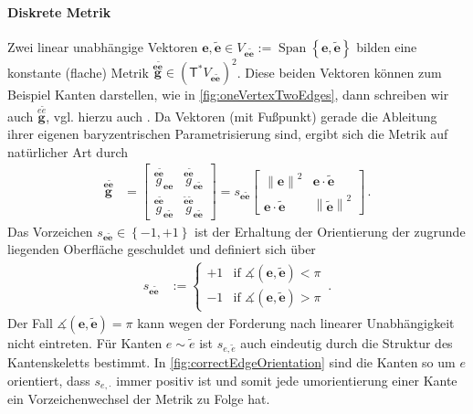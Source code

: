 \documentclass[a4paper,11pt]{scrartcl}
\newcommand{\g}{\mathbf{g}} %
\newcommand{\vect}[1]{\mathbf{#1}}
\newcommand{\Tangent}{\mathsf{T}}
\newcommand{\flatgb}[2]{\overset{#1 #2}{\g}}
\newcommand{\flatg}[2]{\overset{#1 #2}{g}}
\newcommand{\formPeriod}{\,\text{.}}
\begin{document}
    \paragraph{Diskrete Metrik}
      Zwei linear unabhängige  Vektoren \( \vect{e},\tilde{\vect{e}}\in V_{\vect{e}\tilde{\vect{e}}} := \operatorname{Span}\left\{  \vect{e},\tilde{\vect{e}} \right\} \)       
      bilden eine konstante (flache) Metrik \( \flatgb{\vect{e}}{\tilde{\vect{e}}}\in(\Tangent^{*}V_{\vect{e}\tilde{\vect{e}}})^{2} \).
      Diese beiden Vektoren können zum Beispiel Kanten darstellen, wie in \autoref{fig:oneVertexTwoEdges},
      dann schreiben wir auch \( \flatgb{e}{\tilde{e}} \), vgl. hierzu auch \cite{Nestler2016}.
      Da Vektoren (mit Fußpunkt) gerade die Ableitung ihrer eigenen baryzentrischen Parametrisierung sind, 
      ergibt sich die Metrik auf natürlicher Art durch
      \begin{align}
        \flatgb{\vect{e}}{\tilde{\vect{e}}}
            &=
                \begin{bmatrix}
                  \flatg{\vect{e}}{\tilde{\vect{e}}}_{\vect{e}\vect{e}} & \flatg{\vect{e}}{\tilde{\vect{e}}}_{\vect{e}\tilde{\vect{e}}} \\
                  \flatg{\vect{e}}{\tilde{\vect{e}}}_{\vect{e}\tilde{\vect{e}}} & \flatg{\tilde{\vect{e}}}{\tilde{\vect{e}}}_{\vect{e}\tilde{\vect{e}}}
                \end{bmatrix}
             = s_{\vect{e}\tilde{\vect{e}}} 
                  \begin{bmatrix}
                    \left\| \vect{e} \right\|^{2} & \vect{e}\cdot\tilde{\vect{e}} \\
                    \vect{e}\cdot\tilde{\vect{e}} & \left\| \tilde{\vect{e}} \right\|^{2}
                  \end{bmatrix} \formPeriod
      \end{align}
      Das Vorzeichen \( s_{\vect{e}\tilde{\vect{e}}} \in \left\{ -1, +1 \right\} \) ist der Erhaltung der Orientierung der zugrunde liegenden Oberfläche geschuldet
      und definiert sich über
      \begin{align}
        s_{\vect{e}\tilde{\vect{e}}}
          &:=
              \begin{cases}
                +1 & \text{if }\measuredangle(\vect{e},\tilde{\vect{e}}) < \pi \\
                -1 & \text{if }\measuredangle(\vect{e},\tilde{\vect{e}}) > \pi
              \end{cases}\formPeriod
      \end{align}
      Der Fall \( \measuredangle(\vect{e},\tilde{\vect{e}}) = \pi \) kann wegen der Forderung nach linearer Unabhängigkeit nicht eintreten.
      Für Kanten \( e\sim\tilde{e} \) ist \( s_{e,\tilde{e}} \) auch eindeutig durch die Struktur des Kantenskeletts bestimmt.
      In \autoref{fig:correctEdgeOrientation} sind die Kanten so um \( e \) orientiert, dass \( s_{e,\cdot} \) immer positiv ist und somit jede umorientierung einer Kante ein
      Vorzeichenwechsel der Metrik zu Folge hat.
\end{document}
